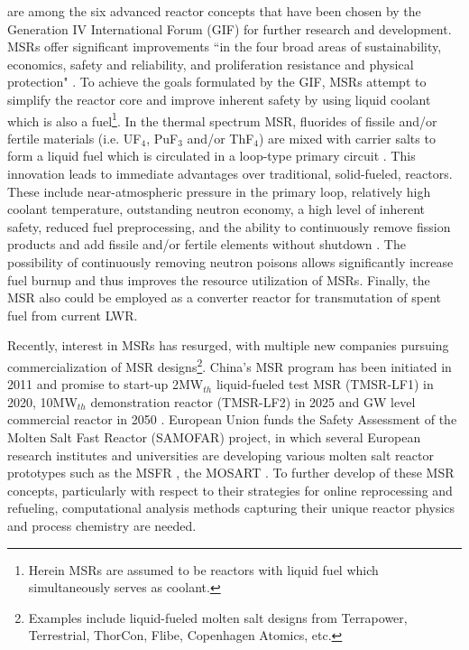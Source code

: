  are among the six advanced reactor concepts that have been chosen by the Generation IV International Forum (GIF) for further research and development. \glspl{MSR} offer significant improvements ``in the four broad areas of sustainability, economics, safety and reliability, and proliferation resistance and physical protection" \cite{doe_technology_2002}. To achieve the goals formulated by the GIF, \glspl{MSR} attempt to simplify the reactor core and improve inherent safety by using liquid coolant which is also a fuel\footnote{Herein \glspl{MSR} are assumed to be reactors with liquid fuel which simultaneously serves as coolant.}. In the thermal spectrum \gls{MSR}, fluorides of fissile and/or fertile materials (i.e. UF$_4$, PuF$_3$ and/or ThF$_4$) are mixed with carrier salts to form a liquid fuel which is circulated in a loop-type primary circuit \cite{haubenreich_experience_1970}. This innovation leads to immediate advantages over traditional, solid-fueled, reactors. These include near-atmospheric pressure in the primary loop, relatively high coolant temperature, outstanding neutron economy, a high level of inherent safety, reduced fuel preprocessing, and the ability to continuously remove fission products and add fissile and/or fertile elements without shutdown \cite{leblanc_molten_2010}. The possibility of continuously removing neutron poisons 
allows significantly increase fuel burnup and thus improves the resource utilization 
of \glspl{MSR}. Finally, the MSR also could be employed as a converter reactor for transmutation of spent fuel from current \gls{LWR}.

Recently, interest in \glspl{MSR} has resurged, with multiple new companies 
pursuing commercialization of \gls{MSR} designs\footnote{Examples include 
liquid-fueled molten salt designs from Terrapower, Terrestrial, ThorCon, Flibe, Copenhagen Atomics, etc.}. China's \gls{MSR} program has been initiated in 2011 and promise 
to start-up 2MW$_{th}$ liquid-fueled test \gls{MSR} (TMSR-LF1) in 2020, 10MW$_{th}$ 
demonstration reactor (TMSR-LF2) in 2025 and GW level commercial reactor in 2050 \cite{zhang_review_2018}. European Union funds the Safety Assessment of the Molten Salt Fast Reactor (SAMOFAR) project, in which several European research institutes and universities are developing various molten salt reactor prototypes such as the \gls{MSFR} \cite{fiorina_molten_2013}, the \gls{MOSART} \cite{ignatiev_molten_2014}.
To further develop of these \gls{MSR} concepts, particularly with respect to their strategies for online reprocessing and refueling, computational analysis methods capturing their unique reactor physics and process chemistry are needed.

